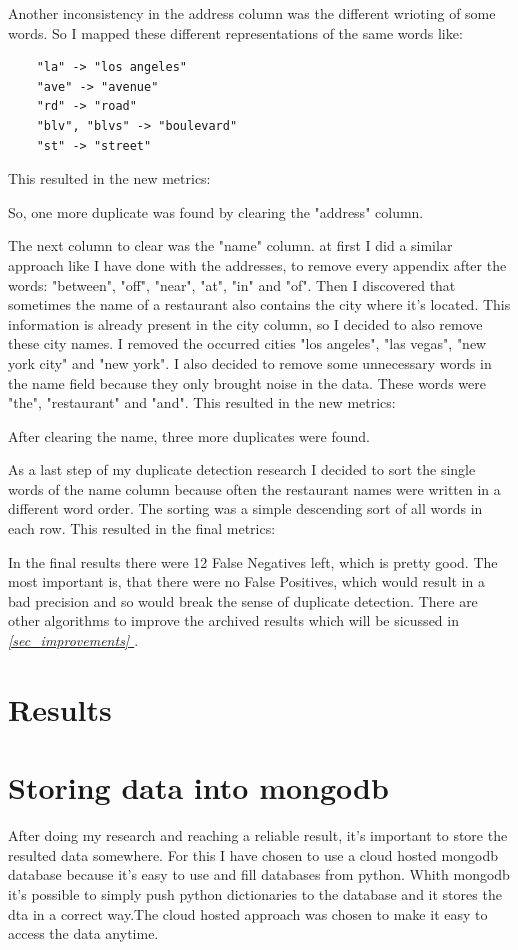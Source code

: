 \documentclass[conference]{IEEEtran}
\newcommand*{\fullref}[1]{\textit{\hyperref[{#1}]{\autoref*{#1} \nameref*{#1}}}}
\begin{document}
Another inconsistency in the address column was the different wrioting of some words. So I mapped these different representations of the same words like: 
\begin{lstlisting}
	"la" -> "los angeles" 
	"ave" -> "avenue"
	"rd" -> "road"
	"blv", "blvs" -> "boulevard" 
	"st" -> "street"
\end{lstlisting} 
This resulted in the new metrics: 

So, one more duplicate was found by clearing the "address" column.

The next column to clear was the "name" column. at first I did a similar approach like I have done with the addresses, to remove every appendix after the words: "between", "off", "near", "at", "in" and "of".  Then I discovered that sometimes the name of a restaurant also contains the city where it's located. This information is already present in the city column, so I decided to also remove these city names. I removed the occurred cities "los angeles", "las vegas", "new york city" and "new york". I also decided to remove some unnecessary words in the name field because they only brought noise in the data. These words were "the", "restaurant" and "and". This resulted in the new metrics: 

After clearing the name, three more duplicates were found. 

As a last step of my duplicate detection research I decided to sort the single words of the name column because often the restaurant names were written in a different word order. The sorting was a simple descending sort of all words in each row. This resulted in the final metrics: 

In the final results there were 12 False Negatives left, which is pretty good. The most important is, that there were no False Positives, which would result in a bad precision and so would break the sense of duplicate detection. There are other algorithms to improve the archived results which will be sicussed in \fullref{sec_improvements}.
\section{Results}
\section{Storing data into mongodb}
After doing my research and reaching a reliable result, it's important to store the resulted data somewhere. For this I have chosen to use a cloud hosted mongodb database because it's easy to use and fill databases from python. Whith mongodb it's possible to simply push python dictionaries to the database and it stores the dta in a correct way.The cloud hosted approach was chosen to make it easy to access the data anytime. 
\end{document}
